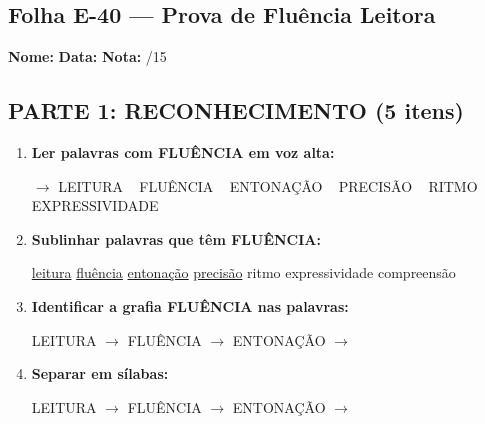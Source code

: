 \subsection{Folha E-40 --- Prova de Fluência Leitora}
\begin{exercicio}



\noindent\textbf{Nome:} \underline{\hspace{3.2cm}} \quad \textbf{Data:} \underline{\hspace{1.6cm}} \quad \textbf{Nota:} \underline{\hspace{0.9cm}}/15


\subsection*{PARTE 1: RECONHECIMENTO (5 itens)}

\begin{enumerate}

  \item \textbf{Ler palavras com FLUÊNCIA em voz alta:}
  \begin{center}
  $\rightarrow$ LEITURA ~ FLUÊNCIA ~ ENTONAÇÃO ~ PRECISÃO ~ RITMO ~ EXPRESSIVIDADE
  \end{center}

  \item \textbf{Sublinhar palavras que têm FLUÊNCIA:}

\begin{center}
  \uline{leitura} \quad \uline{fluência} \quad \uline{entonação} \quad \uline{precisão} \quad ritmo \quad expressividade \quad compreensão
\end{center}

  \item \textbf{Identificar a grafia FLUÊNCIA nas palavras:}
  \begin{center}
  LEITURA $\rightarrow$ \underline{\hspace{1cm}} \quad FLUÊNCIA $\rightarrow$ \underline{\hspace{1cm}} \quad ENTONAÇÃO $\rightarrow$ \underline{\hspace{1cm}}
  \end{center}

  \item \textbf{Separar em sílabas:}
  \begin{center}
  LEITURA $\rightarrow$ \underline{\hspace{1.2cm}} \quad FLUÊNCIA $\rightarrow$ \underline{\hspace{1.2cm}} \quad ENTONAÇÃO $\rightarrow$ \underline{\hspace{1.2cm}}
  \end{center}


\end{enumerate}
\end{exercicio}

